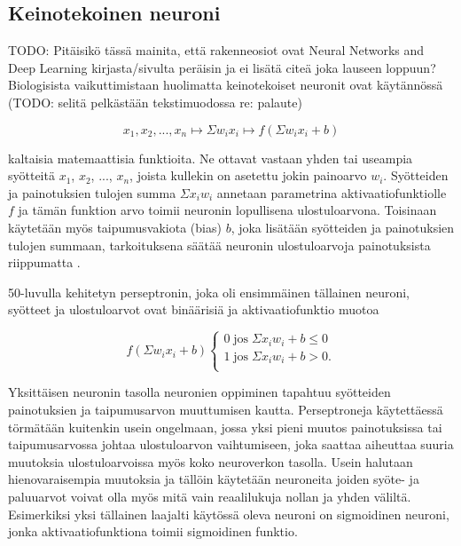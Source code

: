 \documentclass[finnish]{tktltiki2}
\theoremstyle{definition}
\theoremstyle{remark}
\begin{document}
  \subsection{Keinotekoinen neuroni}
    \label{chap:artificial-neuron}

    TODO: Pitäisikö tässä mainita, että rakenneosiot ovat Neural Networks and Deep Learning kirjasta/sivulta peräisin ja ei lisätä citeä joka lauseen loppuun? 
    Biologisista vaikuttimistaan huolimatta keinotekoiset neuronit ovat käytännössä (TODO: selitä pelkästään tekstimuodossa re: palaute)

     $$ x_1, x_2, ..., x_n \mapsto \Sigma w_i x_i \mapsto f(\Sigma w_i x_i + b) $$

    kaltaisia matemaattisia funktioita. Ne ottavat vastaan yhden tai useampia syötteitä $x_1$, $x_2$, ..., $x_n$, joista kullekin on asetettu jokin painoarvo $w_i$. Syötteiden ja painotuksien tulojen summa $\Sigma x_i w_i$ annetaan parametrina aktivaatiofunktiolle $f$ ja tämän funktion arvo toimii neuronin lopullisena ulostuloarvona. Toisinaan käytetään myös taipumusvakiota (bias) $b$, joka lisätään syötteiden ja painotuksien tulojen summaan, tarkoituksena säätää neuronin ulostuloarvoja painotuksista riippumatta \cite{Nielsen-neural}.

    50-luvulla kehitetyn perseptronin, joka oli ensimmäinen tällainen neuroni, syötteet ja ulostuloarvot ovat binäärisiä ja aktivaatiofunktio muotoa

    \begin{equation}
      f(\Sigma w_i x_i + b)
      \begin{cases}
        0\; \text{jos} \; \Sigma x_i w_i + b \leq 0 \\
        1\; \text{jos} \; \Sigma x_i w_i + b > 0. \\
      \end{cases}
      \label{eq:perceptron}
    \end{equation}

    Yksittäisen neuronin tasolla neuronien oppiminen tapahtuu syötteiden painotuksien ja taipumusarvon muuttumisen kautta. Perseptroneja käytettäessä törmätään kuitenkin usein ongelmaan, jossa yksi pieni muutos painotuksissa tai taipumusarvossa johtaa ulostuloarvon vaihtumiseen, joka saattaa aiheuttaa suuria muutoksia ulostuloarvoissa myös koko neuroverkon tasolla. Usein halutaan hienovaraisempia muutoksia ja tällöin käytetään neuroneita joiden syöte- ja paluuarvot voivat olla myös mitä vain reaalilukuja nollan ja yhden väliltä. Esimerkiksi yksi tällainen laajalti käytössä oleva neuroni on sigmoidinen neuroni, jonka aktivaatiofunktiona toimii sigmoidinen funktio.
\end{document}
